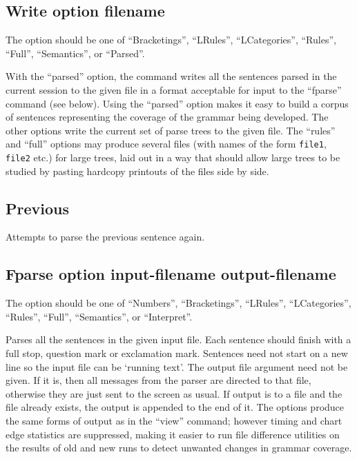 \subsection{Write option filename}

The option should be one of ``Bracketings'', ``LRules'',
``LCategories'', ``Rules'', ``Full'', ``Semantics'', or ``Parsed''.

With the ``parsed'' option, the command writes all the sentences parsed in
the current session to the given file in a format acceptable for input
to the ``fparse'' command (see below). Using the ``parsed'' option makes it
easy to build a corpus of sentences representing the coverage of the grammar
being developed. The other options write the current set of parse trees
to the given file. The ``rules'' and ``full'' options may produce
several files (with names of the form {\tt file1}, {\tt file2} etc.) for
large trees, laid out in a way that should allow large trees to be studied
by pasting hardcopy printouts of the files side by side.

\subsection{Previous}

Attempts to parse the previous sentence again.

\subsection{Fparse option input-filename output-filename}

The option should be one of ``Numbers'', ``Bracketings'', ``LRules'',
``LCategories'', ``Rules'', ``Full'', ``Semantics'', or ``Interpret''.

Parses all the sentences in the given input file. Each sentence should
finish with a full stop, question mark or exclamation mark. Sentences need
not start on a new line so the input file can be `running text'. The
output file argument need not be given. If it is, then all messages from
the parser are directed to that file, otherwise they are just sent to
the screen as usual. If output is to a file and the file already exists,
the output is appended to the end of it. The options produce the same forms
of output as in the ``view'' command; however timing and chart edge
statistics are suppressed, making it easier to run file difference utilities
on the results of old and new runs to detect unwanted changes in
grammar coverage.

